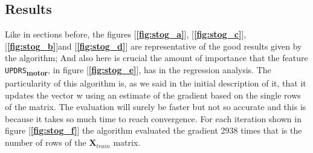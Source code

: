 \documentclass[12pt]{report}
\begin{document}
\subsection{Results}
Like in sections before, the figures [\textbf{\ref{fig:stog_a}}], [\textbf{\ref{fig:stog_c}}], [\textbf{\ref{fig:stog_b}}]and [\textbf{\ref{fig:stog_d}}] are representative of the good results given by the algorithm; And also here is crucial the amount of importance that the feature \texttt{UPDRS}\textsubscript{\textbf{motor}}, in figure [\textbf{\ref{fig:stog_e}}], has in the regression analysis. The particularity of this algorithm is, as we said in the initial description of it, that it updates the vector w using an estimate of the gradient based on the single rows of the matrix. The evaluation will surely be faster but not so accurate and this is because it takes so much time to reach convergence. For each iteration shown in figure [\textbf{\ref{fig:stog_f}}] the algorithm evaluated the gradient 2938 times that is the number of rows of the $\textbf{X}_{train}$ matrix.
\pagebreak
\end{document}
